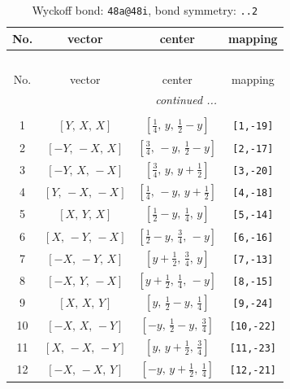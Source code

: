 \documentclass[fleqn,8pt]{jsarticle}
\begin{document}
\begin{longtable}{cccc}
\caption{Wyckoff bond: {\tt 48a@48i}, bond symmetry: {\tt ..2}}
 \\
 \hline \hline
No. & vector & center & mapping \\ \hline \endfirsthead

\multicolumn{3}{l}{\tablename\ \thetable{}} \\
 \hline \hline
No. & vector & center & mapping \\ \hline \endhead

 \hline \hline
\multicolumn{3}{r}{\footnotesize\it continued ...} \\ \endfoot

 \hline \hline
\multicolumn{3}{r}{} \\ \endlastfoot

1 & $\left[ Y,\, X,\, X \right]$ & $\left[ \frac{1}{4},\, y,\, \frac{1}{2} - y \right]$ & {\tt [1,-19]} \\ \hline
2 & $\left[ - Y,\, - X,\, X \right]$ & $\left[ \frac{3}{4},\, - y,\, \frac{1}{2} - y \right]$ & {\tt [2,-17]} \\ \hline
3 & $\left[ - Y,\, X,\, - X \right]$ & $\left[ \frac{3}{4},\, y,\, y + \frac{1}{2} \right]$ & {\tt [3,-20]} \\ \hline
4 & $\left[ Y,\, - X,\, - X \right]$ & $\left[ \frac{1}{4},\, - y,\, y + \frac{1}{2} \right]$ & {\tt [4,-18]} \\ \hline
5 & $\left[ X,\, Y,\, X \right]$ & $\left[ \frac{1}{2} - y,\, \frac{1}{4},\, y \right]$ & {\tt [5,-14]} \\ \hline
6 & $\left[ X,\, - Y,\, - X \right]$ & $\left[ \frac{1}{2} - y,\, \frac{3}{4},\, - y \right]$ & {\tt [6,-16]} \\ \hline
7 & $\left[ - X,\, - Y,\, X \right]$ & $\left[ y + \frac{1}{2},\, \frac{3}{4},\, y \right]$ & {\tt [7,-13]} \\ \hline
8 & $\left[ - X,\, Y,\, - X \right]$ & $\left[ y + \frac{1}{2},\, \frac{1}{4},\, - y \right]$ & {\tt [8,-15]} \\ \hline
9 & $\left[ X,\, X,\, Y \right]$ & $\left[ y,\, \frac{1}{2} - y,\, \frac{1}{4} \right]$ & {\tt [9,-24]} \\ \hline
10 & $\left[ - X,\, X,\, - Y \right]$ & $\left[ - y,\, \frac{1}{2} - y,\, \frac{3}{4} \right]$ & {\tt [10,-22]} \\ \hline
11 & $\left[ X,\, - X,\, - Y \right]$ & $\left[ y,\, y + \frac{1}{2},\, \frac{3}{4} \right]$ & {\tt [11,-23]} \\ \hline
12 & $\left[ - X,\, - X,\, Y \right]$ & $\left[ - y,\, y + \frac{1}{2},\, \frac{1}{4} \right]$ & {\tt [12,-21]} \\ \hline

\end{longtable}
\end{document}
